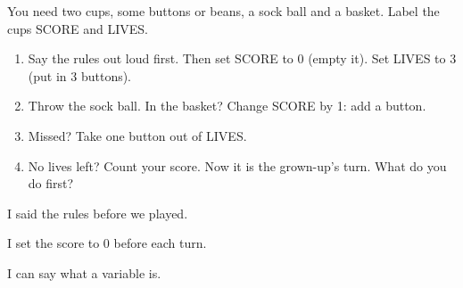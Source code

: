 
\begin{playathome}
You need two cups, some buttons or beans, a sock ball and a basket. Label the cups SCORE and LIVES.
\begin{enumerate}[leftmargin=1.4em,itemsep=2pt]
  \item Say the rules out loud first. Then set SCORE to 0 (empty it). Set LIVES to 3 (put in 3 buttons).
  \item Throw the sock ball. In the basket? Change SCORE by 1: add a button.
  \item Missed? Take one button out of LIVES.
  \item No lives left? Count your score. Now it is the grown-up's turn. What do you do first?
\end{enumerate}
\end{playathome}

\begin{selfcheck}
  \item I said the rules before we played.
  \item I set the score to 0 before each turn.
  \item I can say what a variable is.
\end{selfcheck}
